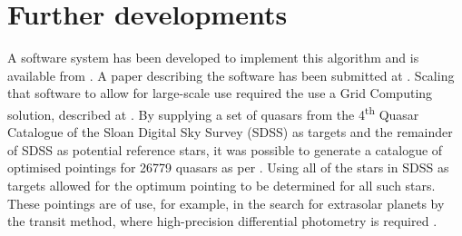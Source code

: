 \documentclass[referee]{aa}
\begin{document}
\section{Further developments}
A software system has been developed to implement this algorithm and is available from \citet{githubrepo}. A paper describing the software has been submitted at \citet{softwarepaper}. Scaling that software to allow for large-scale use required the use a Grid Computing solution, described at \citet{gridsystempaper}. By supplying a set of quasars from the 4\textsuperscript{th} Quasar Catalogue of the Sloan Digital Sky Survey (SDSS) as targets and the remainder of SDSS as potential reference stars, it was possible to generate a catalogue of optimised pointings for 26779 quasars as per \citet{quasarpaper,ZenodoQuasarCatalogue}. Using all of the stars in SDSS as targets allowed for the optimum pointing to be determined for all such stars. These pointings are of use, for example, in the search for extrasolar planets by the transit method, where high-precision differential photometry is required \citep{exopaper,ZenodoXOPCatalogue}.
\end{document}
